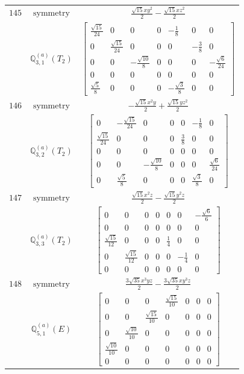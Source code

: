 \documentclass[fleqn,8pt,landscape]{jsarticle}
\begin{document}
\begin{longtable}{ccc}
$ 145 $ & $ \text{symmetry} $ & $ \frac{\sqrt{15} x y^{2}}{2} - \frac{\sqrt{15} x z^{2}}{2} $ \\
$  $ & $ \mathbb{Q}_{3,1}^{(a)}(T_{2}) $ & $ \begin{bmatrix} \frac{\sqrt{15}}{24} & 0 & 0 & 0 & - \frac{1}{8} & 0 & 0 \\ 0 & \frac{\sqrt{15}}{24} & 0 & 0 & 0 & - \frac{3}{8} & 0 \\ 0 & 0 & - \frac{\sqrt{10}}{8} & 0 & 0 & 0 & - \frac{\sqrt{6}}{24} \\ 0 & 0 & 0 & 0 & 0 & 0 & 0 \\ \frac{\sqrt{5}}{8} & 0 & 0 & 0 & - \frac{\sqrt{3}}{8} & 0 & 0 \end{bmatrix} $ \\ \hline
$ 146 $ & $ \text{symmetry} $ & $ - \frac{\sqrt{15} x^{2} y}{2} + \frac{\sqrt{15} y z^{2}}{2} $ \\
$  $ & $ \mathbb{Q}_{3,2}^{(a)}(T_{2}) $ & $ \begin{bmatrix} 0 & - \frac{\sqrt{15}}{24} & 0 & 0 & 0 & - \frac{1}{8} & 0 \\ \frac{\sqrt{15}}{24} & 0 & 0 & 0 & \frac{3}{8} & 0 & 0 \\ 0 & 0 & 0 & 0 & 0 & 0 & 0 \\ 0 & 0 & - \frac{\sqrt{10}}{8} & 0 & 0 & 0 & \frac{\sqrt{6}}{24} \\ 0 & \frac{\sqrt{5}}{8} & 0 & 0 & 0 & \frac{\sqrt{3}}{8} & 0 \end{bmatrix} $ \\ \hline
$ 147 $ & $ \text{symmetry} $ & $ \frac{\sqrt{15} x^{2} z}{2} - \frac{\sqrt{15} y^{2} z}{2} $ \\
$  $ & $ \mathbb{Q}_{3,3}^{(a)}(T_{2}) $ & $ \begin{bmatrix} 0 & 0 & 0 & 0 & 0 & 0 & - \frac{\sqrt{6}}{6} \\ 0 & 0 & 0 & 0 & 0 & 0 & 0 \\ \frac{\sqrt{15}}{12} & 0 & 0 & 0 & \frac{1}{4} & 0 & 0 \\ 0 & \frac{\sqrt{15}}{12} & 0 & 0 & 0 & - \frac{1}{4} & 0 \\ 0 & 0 & 0 & 0 & 0 & 0 & 0 \end{bmatrix} $ \\ \hline
$ 148 $ & $ \text{symmetry} $ & $ \frac{3 \sqrt{35} x^{3} y z}{2} - \frac{3 \sqrt{35} x y^{3} z}{2} $ \\
$  $ & $ \mathbb{Q}_{5,1}^{(a)}(E) $ & $ \begin{bmatrix} 0 & 0 & 0 & \frac{\sqrt{15}}{10} & 0 & 0 & 0 \\ 0 & 0 & \frac{\sqrt{15}}{10} & 0 & 0 & 0 & 0 \\ 0 & \frac{\sqrt{10}}{10} & 0 & 0 & 0 & 0 & 0 \\ \frac{\sqrt{10}}{10} & 0 & 0 & 0 & 0 & 0 & 0 \\ 0 & 0 & 0 & 0 & 0 & 0 & 0 \end{bmatrix} $ \\ \hline

\end{longtable}
\end{document}
